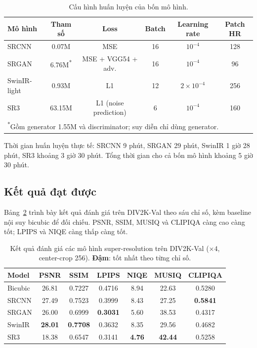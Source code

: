 \begin{table}[H]
\centering
\caption{Cấu hình huấn luyện của bốn mô hình.}
\label{tab:hparams}
\begin{tabular}{|l|c|c|c|c|c|}
\hline
\textbf{Mô hình} & \textbf{Tham số} & \textbf{Loss} & \textbf{Batch} & \textbf{Learning rate} & \textbf{Patch HR} \\ \hline
SRCNN        & 0.07M  & MSE                       & 16 & $10^{-4}$          & 128 \\ \hline
SRGAN        & 6.76M\textsuperscript{*} & MSE + VGG54 + adv. & 16 & $10^{-4}$ & 96  \\ \hline
SwinIR-light & 0.93M  & L1                        & 12 & $2 \times 10^{-4}$ & 256 \\ \hline
SR3          & 63.15M & L1 (noise prediction)     & 6  & $10^{-4}$          & 160 \\ \hline
\multicolumn{6}{|l|}{\footnotesize \textsuperscript{*}Gồm generator 1.55M và discriminator; suy diễn chỉ dùng generator.} \\ \hline
\end{tabular}
\end{table}

Thời gian huấn luyện thực tế: SRCNN 9 phút, SRGAN 29 phút, SwinIR 1 giờ 28 phút,
SR3 khoảng 3 giờ 30 phút. Tổng thời gian cho cả bốn mô hình khoảng 5 giờ 30 phút.

\subsection{Kết quả đạt được}
\label{sec:results}

Bảng~\ref{tab:experiment-results} trình bày kết quả đánh giá trên DIV2K-Val theo
sáu chỉ số, kèm baseline nội suy bicubic để đối chiếu. PSNR, SSIM, MUSIQ và
CLIPIQA càng cao càng tốt; LPIPS và NIQE càng thấp càng tốt.

\begin{table}[H]
\centering
\caption{Kết quả đánh giá các mô hình super-resolution trên DIV2K-Val
($\times 4$, center-crop 256). \textbf{Đậm}: tốt nhất theo từng chỉ số.}
\label{tab:experiment-results}
\begin{tabular}{|l|c|c|c|c|c|c|}
\hline
\textbf{Model} & \textbf{PSNR} & \textbf{SSIM} & \textbf{LPIPS} & \textbf{NIQE} & \textbf{MUSIQ} & \textbf{CLIPIQA} \\ \hline
Bicubic & 26.81 & 0.7227 & 0.4716 & 8.94 & 22.63 & 0.5280 \\ \hline
SRCNN   & 27.49 & 0.7523 & 0.3999 & 8.43 & 27.25 & \textbf{0.5841} \\ \hline
SRGAN   & 26.00 & 0.6999 & \textbf{0.3031} & 5.60 & 38.53 & 0.4317 \\ \hline
SwinIR  & \textbf{28.01} & \textbf{0.7708} & 0.3632 & 8.35 & 29.56 & 0.4682 \\ \hline
SR3     & 18.38 & 0.6547 & 0.3141 & \textbf{4.76} & \textbf{42.44} & 0.5258 \\ \hline
\end{tabular}
\end{table}

